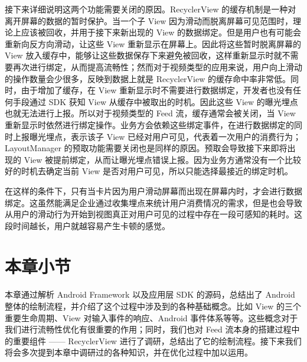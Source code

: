 接下来详细说明这两个功能需要关闭的原因。RecyclerView 的缓存机制是一种对离开屏幕的数据的暂时保护。当一个子 View 因为滑动而脱离屏幕可见范围时，理论上应该被回收，并用于接下来新出现的 View 的数据绑定。但是用户也有可能会重新向反方向滑动，让这些 View 重新显示在屏幕上。因此将这些暂时脱离屏幕的 View 放入缓存中，能够让这些数据保存下来避免被回收，这样重新显示时就不需要再次进行绑定，从而提高流畅性；然而对于视频类型的应用来说，用户向上滑动的操作数量会少很多，反映到数据上就是 RecyclerView 的缓存命中率非常低。同时，由于增加了缓存，在 View 重新显示时不需要进行数据绑定，开发者也没有任何手段通过 SDK 获知 View 从缓存中被取出的时机。因此这些 View 的曝光埋点也就无法进行上报。所以对于视频类型的 Feed 流，缓存通常会被关闭，当 View 重新显示时依然进行绑定操作。业务方会依赖这些绑定事件，在进行数据绑定的同时上报曝光埋点，表示该子 View 已经对用户可见，代表着一次用户的消费行为；LayoutManager 的预取功能需要关闭也是同样的原因。预取会导致接下来即将出现的 View 被提前绑定，从而让曝光埋点错误上报。因为业务方通常没有一个比较好的时机去确定当前 View 是否对用户可见，所以只能选择最接近的绑定时机。

在这样的条件下，只有当卡片因为用户滑动屏幕而出现在屏幕内时，才会进行数据绑定。这虽然能满足企业通过收集埋点来统计用户消费情况的需求，但是也会导致从用户的滑动行为开始到视图真正对用户可见的过程中存在一段可感知的耗时。这段时间越长，用户就越容易产生卡顿的感觉。

\section{本章小节}

本章通过解析 Android Framework 以及应用层 SDK 的源码，总结出了 Android 整体的绘制流程，并介绍了这个过程中涉及到的各种基础概念。比如 View 的三个重要生命周期、View 对输入事件的响应、Android 事件体系等等。这些概念对于我们进行流畅性优化有很重要的作用；同时，我们也对 Feed 流本身的搭建过程中的重要组件 —— RecyclerView 进行了调研，总结出了它的绘制流程。接下来我们将会多次提到本章中调研过的各种知识，并在优化过程中加以运用。

